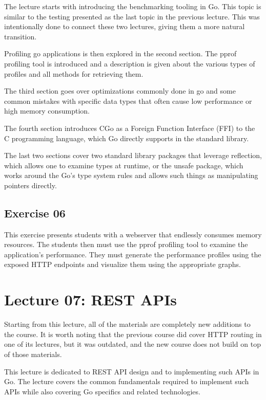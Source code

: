\documentclass[
  digital,
  color,
  oneside,
  nosansbold,
  nocolorbold,
  nolof,
  nolot,
]{fithesis4}
\begin{document}
The lecture starts with introducing the benchmarking tooling in Go. This topic is similar to the testing presented as the last topic in the previous lecture. This was intentionally done to connect these two lectures, giving them a more natural transition.

Profiling go applications is then explored in the second section. The pprof profiling tool is introduced and a description is given about the various types of profiles and all methods for retrieving them.

The third section goes over optimizations commonly done in go and some common mistakes with specific data types that often cause low performance or high memory consumption.

The fourth section introduces CGo as a Foreign Function Interface (FFI) to the C programming language, which Go directly supports in the standard library.

The last two sections cover two standard library packages that leverage reflection, which allows one to examine types at runtime, or the unsafe package, which works around the Go's type system rules and allows such things as manipulating pointers directly.

\subsection{Exercise 06}

This exercise presents students with a webserver that endlessly consumes memory resources. The students then must use the pprof profiling tool to examine the application's performance. They must generate the performance profiles using the exposed HTTP endpoints and visualize them using the appropriate graphs.

\section{Lecture 07: REST APIs}

Starting from this lecture, all of the materials are completely new additions to the course. It is worth noting that the previous course did cover HTTP routing in one of its lectures, but it was outdated, and the new course does not build on top of those materials.

This lecture is dedicated to REST API design and to implementing such APIs in Go. The lecture covers the common fundamentals required to implement such APIs while also covering Go specifics and related technologies. 
\end{document}
